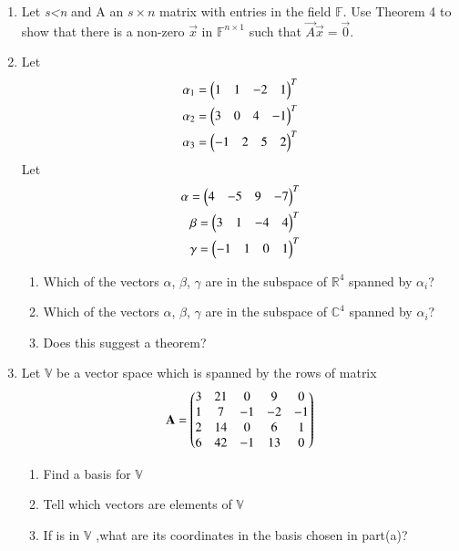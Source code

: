 \renewcommand{\theequation}{\theenumi}
\renewcommand{\thefigure}{\theenumi}
\begin{enumerate}[label=\thesubsection.\arabic*.,ref=\thesubsection.\theenumi]
%
\item Let \textit{s\textless n} and A an $s\times n$ matrix with entries in the field $\mathbb{F}$. Use Theorem 4 to show that there is a non-zero $\vec{x}$ in $\mathbb{F}^{n\times 1}$ such that $\vec{A}\vec{x}=\vec{0}$. 
%
\\
\solution

%
\item Let
\begin{align} 
\alpha_1=\begin{pmatrix}1&1&-2&1\end{pmatrix}^T \\
\alpha_2=\begin{pmatrix}3&0&4&-1\end{pmatrix}^T \\
\alpha_3=\begin{pmatrix}-1&2&5&2\end{pmatrix}^T
\end{align}
Let
\begin{align}
\alpha=\begin{pmatrix}4&-5&9&-7\end{pmatrix}^T \\
\beta=\begin{pmatrix}3&1&-4&4\end{pmatrix}^T \\
\gamma=\begin{pmatrix}-1&1&0&1\end{pmatrix}^T
\end{align}
\begin{enumerate}
\item Which of the vectors $\alpha$, $\beta$, $\gamma$ are in the subspace of $\mathbb{R}^4$ spanned by $\alpha_i$?
\item Which of the vectors $\alpha$, $\beta$, $\gamma$ are in the subspace of $\mathbb{C}^4$ spanned by $\alpha_i$?
\item Does this suggest a theorem?
\end{enumerate}
%
%
\solution

%
\item Let $\mathbb{V}$ be a vector space which is spanned by the rows of matrix
\begin{align}
    \mathbf{A} = \begin{pmatrix}3&21&0&9&0\\1&7&-1&-2&-1\\2&14&0&6&1\\6&42&-1&13&0\end{pmatrix}\label{eq:solutions/2/5/6/eq:mat}
\end{align}
\begin{enumerate}[label=\alph*.]
\item Find a basis for $\mathbb{V}$
\item Tell which vectors  are elements of $\mathbb{V}$ 
\item If  is in $\mathbb{V}$ ,what are its coordinates in the basis chosen in part(a)?
\end{enumerate}
%
\solution


\end{enumerate}
